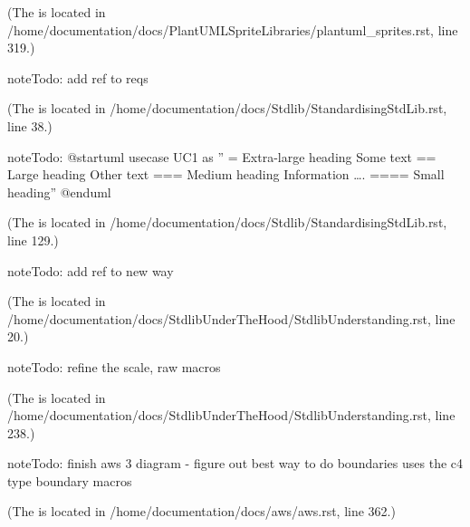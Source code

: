 \documentclass[letterpaper,10pt,english]{sphinxmanual}
\begin{document}
(The {\hyperref[\detokenize{PlantUMLSpriteLibraries/plantuml_sprites:id1}]{}} is located in /home/documentation/docs/PlantUMLSpriteLibraries/plantuml\_sprites.rst, line 319.)

\begin{sphinxadmonition}{note}{Todo:}
add ref to reqs
\end{sphinxadmonition}

(The {\hyperref[\detokenize{Stdlib/StandardisingStdLib:id1}]{}} is located in /home/documentation/docs/Stdlib/StandardisingStdLib.rst, line 38.)

\begin{sphinxadmonition}{note}{Todo:}
@startuml
usecase UC1 as ”
= Extra-large heading
Some text
== Large heading
Other text
=== Medium heading
Information
….
==== Small heading”
@enduml
\end{sphinxadmonition}

(The {\hyperref[\detokenize{Stdlib/StandardisingStdLib:id2}]{}} is located in /home/documentation/docs/Stdlib/StandardisingStdLib.rst, line 129.)

\begin{sphinxadmonition}{note}{Todo:}
add ref to new way
\end{sphinxadmonition}

(The {\hyperref[\detokenize{StdlibUnderTheHood/StdlibUnderstanding:id1}]{}} is located in /home/documentation/docs/StdlibUnderTheHood/StdlibUnderstanding.rst, line 20.)

\begin{sphinxadmonition}{note}{Todo:}
refine the scale, raw macros
\end{sphinxadmonition}

(The {\hyperref[\detokenize{StdlibUnderTheHood/StdlibUnderstanding:id2}]{}} is located in /home/documentation/docs/StdlibUnderTheHood/StdlibUnderstanding.rst, line 238.)

\begin{sphinxadmonition}{note}{Todo:}
finish aws 3 diagram - figure out best way to do boundaries
 uses the c4 type boundary macros
\end{sphinxadmonition}

(The {\hyperref[\detokenize{aws/aws:id17}]{}} is located in /home/documentation/docs/aws/aws.rst, line 362.)
\end{document}
